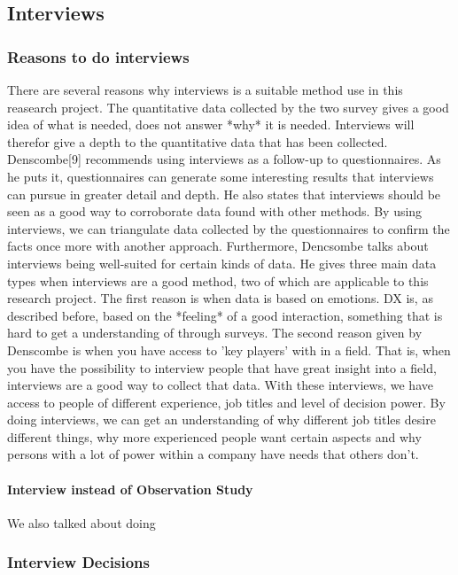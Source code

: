 \documentclass{article}
\begin{document}
\subsection{Interviews}

\subsubsection{Reasons to do interviews}
There are several reasons why interviews is a suitable method use in this reasearch project.
The quantitative data collected
by the two survey gives a good idea of what is needed, does not answer *why* it is needed.
Interviews will therefor give a depth to the quantitative data that has been collected.
Denscombe[9] recommends using interviews as a follow-up to questionnaires. As he puts it,
questionnaires can generate some interesting results that interviews can pursue
in greater detail and depth. He also states that interviews should be seen as a good way
to corroborate data found with other methods. By using interviews, we can triangulate data
collected by the questionnaires to confirm the facts once more with another approach.
Furthermore, Dencsombe talks about interviews being well-suited for certain kinds of data.
He gives three main data types when interviews are a good method,
two of which are applicable to this research project. The first reason is
when data is based on emotions. DX is, as described before, based on the *feeling*
of a good interaction, something that is hard to get a understanding of through
surveys. The second reason given by Denscombe is when you have access to 'key players'
with in a field. That is, when you have the possibility to interview people
that have great insight into a field, interviews are a good way to collect that data.
With these interviews, we have access to people of different experience, job titles
and level of decision power. By doing interviews, we can get an understanding
of why different job titles desire different things, why more experienced people
want certain aspects and why persons with a lot of power within a company
have needs that others don't.

\paragraph{Interview instead of Observation Study}
We also talked about doing

\subsubsection{Interview Decisions}
\end{document}

